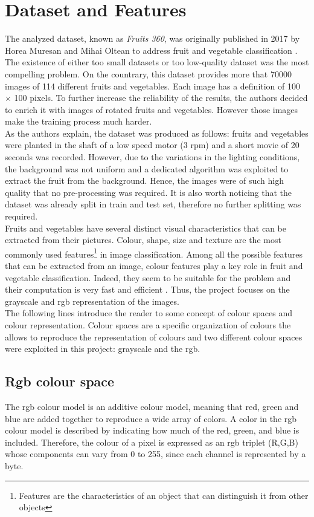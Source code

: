 \documentclass{article}
\begin{document}
\section{Dataset and Features}
The analyzed dataset, known as \textit{Fruits 360}, was originally published in 2017 by Horea Muresan and Mihai Oltean to address fruit and vegetable classification \cite{dataset}. The existence of either too small datasets or too low-quality dataset was the most compelling problem.  On the countrary, this dataset provides more that 70000 images of 114 different fruits and vegetables. Each image has a definition of 100 $\times$ 100 pixels. To further increase the reliability of the results, the authors decided to enrich it with images of rotated fruits and vegetables. However those images make the training process much harder.\\
As the authors explain, the dataset was produced as follows: fruits and vegetables were planted in the shaft of a low speed motor (3 rpm) and a short movie of 20 seconds was recorded. However, due to the variations in the lighting conditions, the background was not uniform and a dedicated algorithm was exploited to extract the fruit from the background. Hence, the images were of such high quality that no pre-processing was required.
It is also worth noticing that the dataset was already split in train and test set, therefore no further splitting was required.\\
Fruits and vegetables have several distinct visual characteristics that can be extracted from their pictures. Colour, shape, size and texture are the most commonly used features\footnote{Features are the characteristics of an object that can distinguish it from other objects} in image classification. Among all the possible features that can be extracted from an image, colour features play a key role in fruit and vegetable classification. Indeed, they seem to be suitable for the problem and their computation is very fast and efficient \cite{review}. Thus, the project focuses on the grayscale and rgb representation of the images. \\
The following lines introduce the reader to some concept of colour spaces and colour representation.
Colour spaces are a specific organization of colours the allows to reproduce the representation of colours and two different colour spaces were exploited in this project: grayscale and the rgb.
\subsection{Rgb colour space}
The rgb colour model is an additive colour model, meaning that red, green and blue are added together to reproduce a wide array of colors. A color in the rgb colour model is described by indicating how much of the red, green, and blue is included. Therefore, the colour of a pixel is expressed as an rgb triplet (R,G,B) whose components can vary from 0 to 255, since each channel is represented by a byte.
\end{document}
